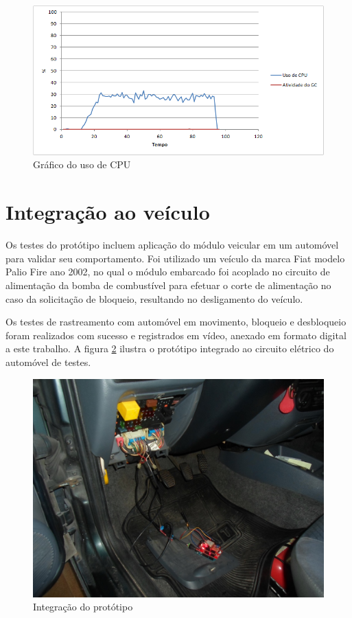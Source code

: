 \begin{figure}[!htb]
	\centering
	\includegraphics[width=\textwidth]{figures/teste_cpu.png}
	\caption{Gráfico do uso de CPU}
	\label{fig:profilecpu}
\end{figure}

\section{Integra\c{c}\~{a}o ao ve\'{i}culo}

Os testes do protótipo incluem aplicação do módulo veicular em um automóvel para validar seu comportamento. Foi utilizado um veículo da marca Fiat modelo Palio Fire ano 2002, no qual o módulo embarcado foi acoplado no circuito de alimentação da bomba de combustível para efetuar o corte de alimentação no caso da solicitação de bloqueio, resultando no desligamento do veículo. 

Os testes de rastreamento com automóvel em movimento, bloqueio e desbloqueio foram realizados com sucesso e registrados em vídeo, anexado em formato digital a este trabalho. A figura \ref{fig:integracaopalio} ilustra o protótipo integrado ao circuito elétrico do automóvel de testes.

\begin{figure}[!htb]
	\centering
	\includegraphics[width=\textwidth]{figures/integracao.jpg}
	\caption{Integração do protótipo}
	\label{fig:integracaopalio}
\end{figure}

